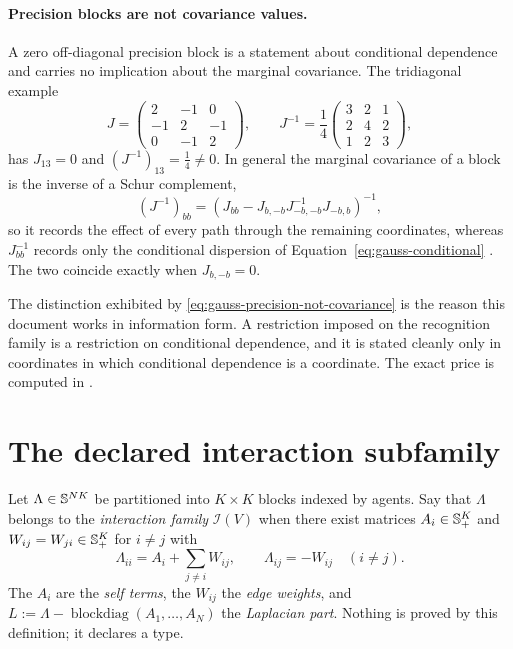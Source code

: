 \paragraph{Precision blocks are not covariance values.}
A zero off-diagonal precision block is a statement about conditional dependence and carries no implication about the marginal covariance. The tridiagonal example
\begin{equation}
J=\begin{pmatrix}2&-1&0\\-1&2&-1\\0&-1&2\end{pmatrix},
\qquad
J^{-1}=\frac14\begin{pmatrix}3&2&1\\2&4&2\\1&2&3\end{pmatrix},
\label{eq:gauss-precision-not-covariance}
\end{equation}
has $J_{13}=0$ and $(J^{-1})_{13}=\tfrac14\neq0$. In general the marginal covariance of a block is the inverse of a Schur complement,
\begin{equation}
\left(J^{-1}\right)_{bb}
=\left(J_{bb}-J_{b,-b}J_{-b,-b}^{-1}J_{-b,b}\right)^{-1},
\label{eq:gauss-marginal-block}
\end{equation}
so it records the effect of every path through the remaining coordinates, whereas $J_{bb}^{-1}$ records only the conditional dispersion of Equation~\eqref{eq:gauss-conditional} \citep{Zhang2005Schur}. The two coincide exactly when $J_{b,-b}=0$. 

The distinction exhibited by \eqref{eq:gauss-precision-not-covariance} is
the reason this document works in information form. A restriction imposed
on the recognition family is a restriction on conditional dependence, and
it is stated cleanly only in coordinates in which conditional dependence is
a coordinate. The exact price is computed in .

\section{The declared interaction subfamily}
\label{sec:gauss-interaction-family}

Let $\Lambda\in\mathbb S^{NK}$ be partitioned into $K\times K$ blocks indexed by agents. Say that $\Lambda$ belongs to the \emph{interaction family} $\mathcal I(V)$ when there exist matrices $A_i\in\mathbb S_{+}^{K}$ and $W_{ij}=W_{ji}\in\mathbb S_{+}^{K}$ for $i\neq j$ with
\begin{equation}
\Lambda_{ii}=A_i+\sum_{j\neq i}W_{ij},
\qquad
\Lambda_{ij}=-W_{ij}\quad(i\neq j).
\label{eq:gauss-interaction-family}
\end{equation}
The $A_i$ are the \emph{self terms}, the $W_{ij}$ the \emph{edge weights}, and $L:=\Lambda-\operatorname{blockdiag}(A_1,\dots,A_N)$ the \emph{Laplacian part}. Nothing is proved by this definition; it declares a type. 

